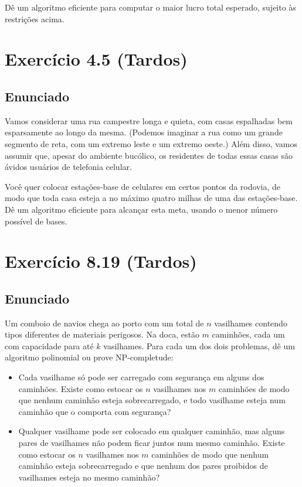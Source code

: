 \documentclass[11pt]{article}
\begin{document}
Dê um algoritmo eficiente para computar o maior lucro total
esperado, sujeito às restrições acima.

\section{Exercício 4.5 (Tardos)}
\label{sec-4}

\subsection{Enunciado}
\label{sec-4-1}

Vamos considerar uma rua campestre longa e quieta, com casas
espalhadas bem esparsamente ao longo da mesma. (Podemos imaginar a
rua como um grande segmento de reta, com um extremo leste e um
extremo oeste.) Além disso, vamos assumir que, apesar do ambiente
bucólico, os residentes de todas essas casas são ávidos usuários de
telefonia celular.

Você quer colocar estações-base de celulares em certos pontos da
rodovia, de modo que toda casa esteja a no máximo quatro milhas de
uma das estações-base. Dê um algoritmo eficiente para alcançar esta
meta, usando o menor número possível de bases.

\section{Exercício 8.19 (Tardos)}
\label{sec-5}

\subsection{Enunciado}
\label{sec-5-1}

Um comboio de navios chega ao porto com um total de $n$ vasilhames
contendo tipos diferentes de materiais perigosos.
Na doca, estão $m$ caminhões, cada um com capacidade para até $k$
vasilhames.  Para cada um dos dois problemas, dê um algoritmo
polinomial ou prove NP-completude:


\begin{itemize}
\item Cada vasilhame só pode ser carregado com segurança em alguns
dos caminhões. Existe como estocar os $n$ vasilhames nos $m$
caminhões de modo que nenhum caminhão esteja sobrecarregado, e
todo vasilhame esteja num caminhão que o comporta com segurança?

\item Qualquer vasilhame pode ser colocado em qualquer caminhão,
mas alguns pares de vasilhames não podem ficar juntos num mesmo
caminhão. Existe como estocar os $n$ vasilhames nos $m$
caminhões de modo que nenhum caminhão esteja sobrecarregado e
que nenhum dos pares proibidos de vasilhames esteja no mesmo
caminhão?
\end{itemize}
\end{document}
